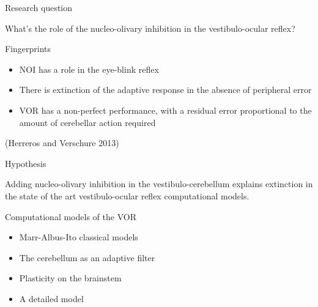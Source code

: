 \documentclass[ignorenonframetext,]{beamer}
\begin{document}
\begin{frame}{Research question}

What's the role of the nucleo-olivary inhibition in the vestibulo-ocular
reflex?

\begin{block}{Fingerprints}

\begin{itemize}
\itemsep1pt\parskip0pt
\item
  NOI has a role in the eye-blink reflex
\item
  There is extinction of the adaptive response in the absence of
  peripheral error
\item
  VOR has a non-perfect performance, with a residual error proportional
  to the amount of cerebellar action required
\end{itemize}

(Herreros and Verschure 2013)

\end{block}

\end{frame}

\begin{frame}{Hypothesis}

Adding nucleo-olivary inhibition in the vestibulo-cerebellum explains
extinction in the state of the art vestibulo-ocular reflex computational
models.

\end{frame}

\begin{frame}{Computational models of the VOR}

\begin{itemize}
\itemsep1pt\parskip0pt
\item
  Marr-Albus-Ito classical models
\item
  The cerebellum as an adaptive filter
\item
  Plasticity on the brainstem
\item
  A detailed model
\end{itemize}

\end{frame}
\end{document}
